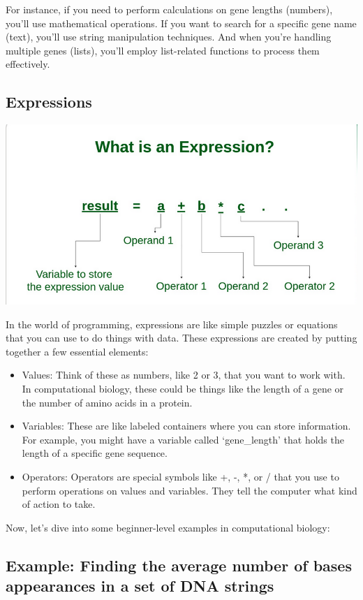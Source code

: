 \documentclass[
]{book}
\begin{document}
For instance, if you need to perform calculations on gene lengths (numbers), you'll use mathematical operations. If you want to search for a specific gene name (text), you'll use string manipulation techniques. And when you're handling multiple genes (lists), you'll employ list-related functions to process them effectively.

\hypertarget{expressions}{%
\subsection{Expressions}\label{expressions}}

\includegraphics{images/expression.png}

In the world of programming, expressions are like simple puzzles or equations that you can use to do things with data. These expressions are created by putting together a few essential elements:

\begin{itemize}
\item
  Values: Think of these as numbers, like 2 or 3, that you want to work with. In computational biology, these could be things like the length of a gene or the number of amino acids in a protein.
\item
  Variables: These are like labeled containers where you can store information. For example, you might have a variable called `gene\_length' that holds the length of a specific gene sequence.
\item
  Operators: Operators are special symbols like +, -, *, or / that you use to perform operations on values and variables. They tell the computer what kind of action to take.
\end{itemize}

Now, let's dive into some beginner-level examples in computational biology:

\hypertarget{example-finding-the-average-number-of-bases-appearances-in-a-set-of-dna-strings}{%
\subsection{Example: Finding the average number of bases appearances in a set of DNA strings}\label{example-finding-the-average-number-of-bases-appearances-in-a-set-of-dna-strings}}
\end{document}
